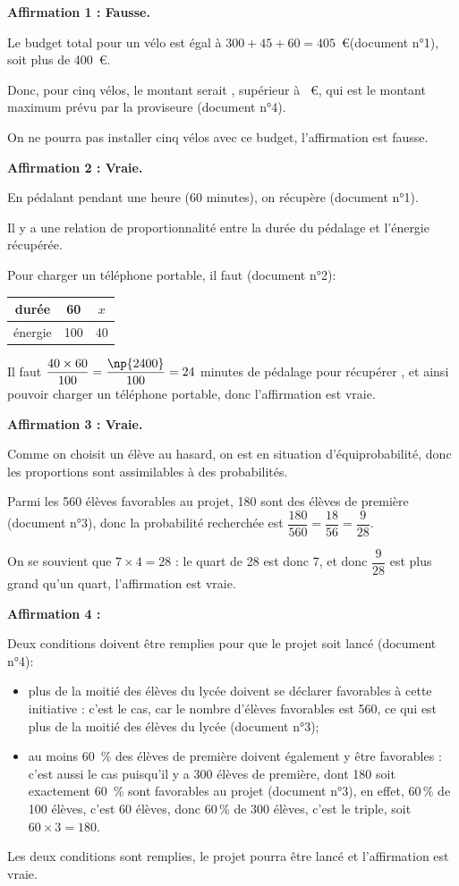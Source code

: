 \textbf{Affirmation 1 : Fausse.}

	Le budget total pour un vélo est égal à $300+45+60 = 405$~\euro (document n°1), soit plus de 400~\euro.

	Donc, pour cinq vélos, le montant serait , supérieur à ~\euro, qui est le montant maximum prévu par la proviseure (document n°4).

	On ne pourra pas installer cinq vélos avec ce budget, l'affirmation est fausse.

\vspace{5mm}
\textbf{Affirmation 2 : Vraie.}

	En pédalant pendant une heure (60 minutes), on récupère  (document n°1).

	Il y a une relation de proportionnalité entre la durée du pédalage et l'énergie récupérée.

	Pour charger un téléphone portable, il faut  (document n°2):

	\begin{tabular}{c|c|c}
		durée&60  &$x$ \\\hline
		énergie&100  & 40 \\
	\end{tabular}\quad
	Il faut $\dfrac{40\times60}{100} = \dfrac{\np{2400}}{100} = 24$ minutes de pédalage pour récupérer , et ainsi pouvoir charger un téléphone portable, donc l'affirmation est vraie.

\vspace{5mm}
\textbf{Affirmation 3 : Vraie.}

	Comme on choisit un élève au hasard, on est en situation d'équiprobabilité, donc les proportions sont assimilables à des probabilités.

	Parmi les 560 élèves favorables au projet, 180 sont des élèves de première (document n°3), donc la probabilité recherchée est $\dfrac{180}{560} = \dfrac{18}{56} = \dfrac{9}{28}$.

	On se souvient que $7\times4 = 28$ : le quart de 28 est donc 7, et donc $\dfrac{9}{28}$ est plus grand qu'un quart, l'affirmation est vraie.

\vspace{5mm}
\textbf{Affirmation 4 :}

	Deux conditions doivent être remplies pour que le projet soit lancé (document n°4):
	\begin{itemize}
		\item plus de la moitié des élèves du lycée doivent se déclarer favorables à cette initiative : c'est le cas, car le nombre d'élèves favorables est 560, ce qui est plus de la moitié des  élèves du lycée (document n°3);

		\item au moins 60~\% des élèves de première doivent également y être favorables : c'est aussi le cas puisqu'il y a 300 élèves de première, dont 180 soit exactement 60~\% sont favorables au projet (document n°3), en effet, 60\,\% de 100 élèves, c'est 60 élèves, donc 60\,\% de 300 élèves, c'est le triple, soit $60 \times 3 = 180$.
	\end{itemize}
	Les deux conditions sont remplies, le projet pourra être lancé et l'affirmation est vraie.

